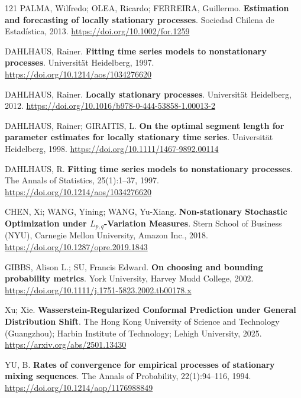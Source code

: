 \begin{thebibliography}{121}
  PALMA, Wilfredo; OLEA, Ricardo; FERREIRA, Guillermo.
  \newblock \textbf{Estimation and forecasting of locally stationary processes}.
  \newblock Sociedad Chilena de Estadística, 2013.
  \newblock \url{https://doi.org/10.1002/for.1259}

  DAHLHAUS, Rainer.
  \newblock \textbf{Fitting time series models to nonstationary processes}.
  \newblock Universität Heidelberg, 1997.
  \newblock \url{https://doi.org/10.1214/aos/1034276620}

  DAHLHAUS, Rainer.
  \newblock \textbf{Locally stationary processes}.
  \newblock Universität Heidelberg, 2012.
  \newblock \url{https://doi.org/10.1016/b978-0-444-53858-1.00013-2}

  DAHLHAUS, Rainer; GIRAITIS, L.
  \newblock \textbf{On the optimal segment length for parameter estimates for locally stationary time series}.
  \newblock Universität Heidelberg, 1998.
  \newblock \url{https://doi.org/10.1111/1467-9892.00114}

  DAHLHAUS, R.
  \newblock \textbf{Fitting time series models to nonstationary processes}.
  \newblock The Annals of Statistics, 25(1):1--37, 1997.
  \newblock \url{https://doi.org/10.1214/aos/1034276620}

  CHEN, Xi; WANG, Yining; WANG, Yu-Xiang.
  \newblock \textbf{Non-stationary Stochastic Optimization under $L_{p,q}$-Variation Measures}.
  \newblock Stern School of Business (NYU), Carnegie Mellon University, Amazon Inc., 2018.
  \newblock \url{https://doi.org/10.1287/opre.2019.1843}

  GIBBS, Alison L.; SU, Francis Edward.
  \newblock \textbf{On choosing and bounding probability metrics}.
  \newblock York University, Harvey Mudd College, 2002.
  \newblock \url{https://doi.org/10.1111/j.1751-5823.2002.tb00178.x}

  Xu; Xie.
  \newblock \textbf{Wasserstein-Regularized Conformal Prediction under General Distribution Shift}.
  \newblock The Hong Kong University of Science and Technology (Guangzhou); Harbin Institute of Technology; Lehigh University, 2025.
  \newblock \url{https://arxiv.org/abs/2501.13430}

  YU, B.
  \newblock \textbf{Rates of convergence for empirical processes of stationary mixing sequences}.
  \newblock The Annals of Probability, 22(1):94--116, 1994.
  \newblock \url{https://doi.org/10.1214/aop/1176988849}


\end{thebibliography}
